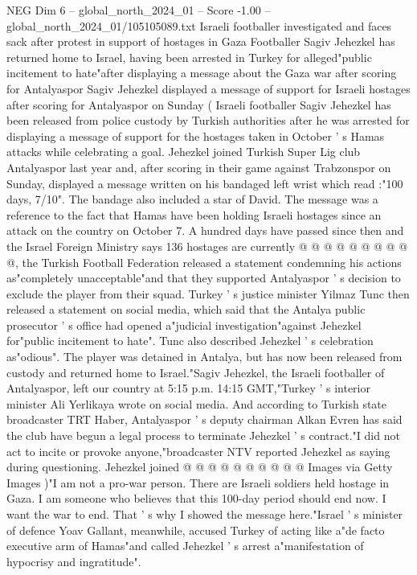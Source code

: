 \begin{textsample}{NEG Dim 6 – global\_north\_2024\_01 – Score -1.00 – global\_north\_2024\_01/105105089.txt}  \label{ex:f6_neg_328}
Israeli footballer investigated and faces sack after protest in support of hostages in Gaza Footballer Sagiv Jehezkel has returned home to Israel, having been arrested in Turkey for alleged"public incitement to hate"after displaying a message about the Gaza war after scoring for Antalyaspor Sagiv Jehezkel displayed a message of support for Israeli hostages after scoring for Antalyaspor on Sunday ( Israeli footballer Sagiv Jehezkel has been released from police custody by Turkish authorities after he was arrested for displaying a message of support for the hostages taken in October ' s Hamas attacks while celebrating a goal.
Jehezkel joined Turkish Super Lig club Antalyaspor last year and, after scoring in their game against Trabzonspor on Sunday, displayed a message written on his bandaged left wrist which read :"100 days, 7/10".
The bandage also included a star of David.
The message was a reference to the fact that Hamas have been holding Israeli hostages since an attack on the country on October 7.
A hundred days have passed since then and the Israel Foreign Ministry says 136 hostages are currently @ @ @ @ @ @ @ @ @ @, the Turkish Football Federation released a statement condemning his actions as"completely unacceptable"and that they supported Antalyaspor ' s decision to exclude the player from their squad.
Turkey ' s justice minister Yilmaz Tunc then released a statement on social media, which said that the Antalya public prosecutor ' s office had opened a"judicial investigation"against Jehezkel for"public incitement to hate".
Tunc also described Jehezkel ' s celebration as"odious".
The player was detained in Antalya, but has now been released from custody and returned home to Israel."Sagiv Jehezkel, the Israeli footballer of Antalyaspor, left our country at 5:15 p.m. 14:15 GMT,"Turkey ' s interior minister Ali Yerlikaya wrote on social media.
And according to Turkish state broadcaster TRT Haber, Antalyaspor ' s deputy chairman Alkan Evren has said the club have begun a legal process to terminate Jehezkel ' s contract."I did not act to incite or provoke anyone,"broadcaster NTV reported Jehezkel as saying during questioning.
Jehezkel joined @ @ @ @ @ @ @ @ @ @ Images via Getty Images )"I am not a pro-war person.
There are Israeli soldiers held hostage in Gaza.
I am someone who believes that this 100-day period should end now.
I want the war to end.
That ' s why I showed the message here."Israel ' s minister of defence Yoav Gallant, meanwhile, accused Turkey of acting like a"de facto executive arm of Hamas"and called Jehezkel ' s arrest a"manifestation of hypocrisy and ingratitude".

\end{textsample}
